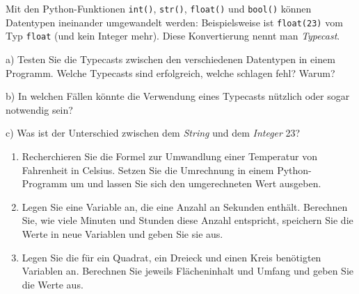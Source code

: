 \documentclass[11pt, a4paper, oneside]{article}
\begin{document}
	Mit den Python-Funktionen \texttt{int()}, \texttt{str()}, \texttt{float()} und \texttt{bool()} können Datentypen ineinander umgewandelt werden: Beispielsweise ist \texttt{float(23)} vom Typ \texttt{float} (und kein Integer mehr).
	Diese Konvertierung nennt man \emph{Typecast}.
	
	a) Testen Sie die Typecasts zwischen den verschiedenen Datentypen in einem Programm.
	Welche Typecasts sind erfolgreich, welche schlagen fehl? Warum?
	
	\lines[2cm]
	
	b) In welchen Fällen könnte die Verwendung eines Typecasts nützlich oder sogar notwendig sein?
	
	\lines[2cm]
	
	c) Was ist der Unterschied zwischen dem \emph{String} \texttt{\dq} und dem \emph{Integer} 23?
	
	\lines[2cm]
	
	
	\begin{enumerate}[label=\alph*)]
		\item Recherchieren Sie die Formel zur Umwandlung einer Temperatur von Fahrenheit in Celsius.
		Setzen Sie die Umrechnung in einem Python-Programm um und lassen Sie sich den umgerechneten Wert ausgeben.
		\item Legen Sie eine Variable an, die eine Anzahl an Sekunden enthält.
		Berechnen Sie, wie viele Minuten und Stunden diese Anzahl entspricht, speichern Sie die Werte in neue Variablen und geben Sie sie aus.
		\item Legen Sie die für ein Quadrat, ein Dreieck und einen Kreis benötigten Variablen an.
		Berechnen Sie jeweils Flächeninhalt und Umfang und geben Sie die Werte aus.
	\end{enumerate}
\end{document}
